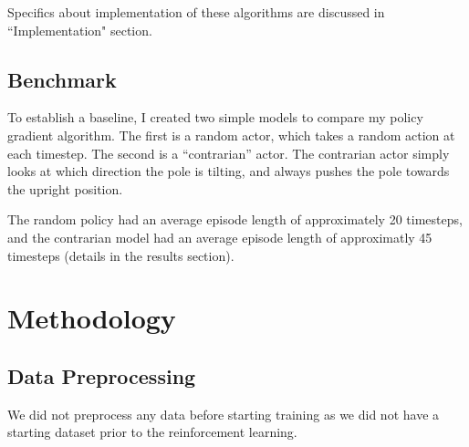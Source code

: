 \documentclass[12pt,a4paper]{article}
\begin{document}
Specifics about implementation of these algorithms are discussed in ``Implementation" section.


\subsection*{Benchmark}
To establish a baseline, I created two simple models to compare my policy gradient algorithm. The first is a random actor, which takes a random action at each timestep. The second is a ``contrarian'' actor. The contrarian actor simply looks at which direction the pole is tilting, and always pushes the pole towards the upright position.

The random policy had an average episode length of approximately 20 timesteps, and the contrarian model had an average episode length of approximatly 45 timesteps (details in the results section). 

\section{Methodology}
%
\subsection*{Data Preprocessing}
We did not preprocess any data before starting training as we did not have a starting dataset prior to the reinforcement learning.
\end{document}
